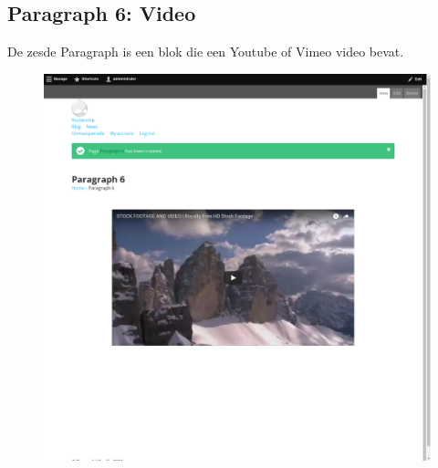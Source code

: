 \subsection{Paragraph 6: Video}
De zesde Paragraph is een blok die een Youtube of Vimeo video bevat.
\begin{figure}[h]
\includegraphics[width=1\textwidth]{img/p006.png}
\end{figure}

\clearpage
